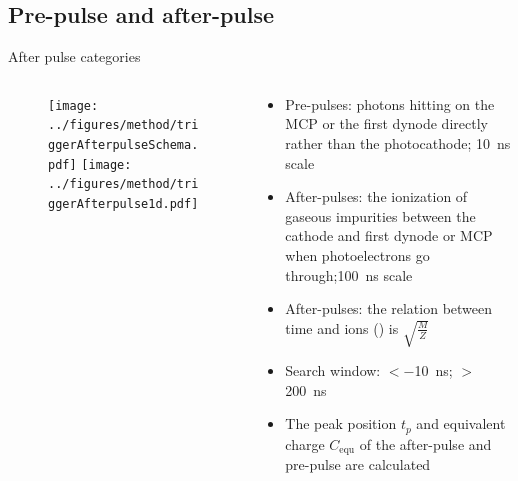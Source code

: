 \documentclass[aspectratio=169]{beamer}
\begin{document}
\subsection{Pre-pulse and after-pulse}
\begin{frame}{After pulse categories}
    \begin{columns}
        \begin{column}{0.45\textwidth}
            \begin{figure}
                \texttt{[image: ../figures/method/triggerAfterpulseSchema.pdf]}
                \texttt{[image: ../figures/method/triggerAfterpulse1d.pdf]}
            \end{figure}
        \end{column}
        \begin{column}{0.55\textwidth}
            \begin{itemize}
                \item Pre-pulses: photons hitting on the MCP or the first dynode directly rather than the photocathode; \SI{10}{ns} scale
                \item After-pulses: the ionization of gaseous impurities between the cathode and first dynode or MCP when photoelectrons go through;\SI{100}{ns} scale
                \item After-pulses: the relation between time and ions () is $\sqrt{\frac{M}{Z}}$
                \item Search window: $<$\SI{-10}{ns}; $>$\SI{200}{ns}
                \item The peak position $t_p$ and equivalent charge $C_{\mathrm{equ}}$ of the after-pulse and pre-pulse are calculated
            \end{itemize}
        \end{column}
    \end{columns}
\end{frame}
\end{document}
